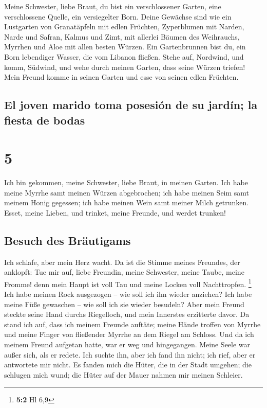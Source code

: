 Meine Schwester, liebe Braut, du bist ein verschlossener
Garten, eine verschlossene Quelle, ein versiegelter Born.
 Deine Gewächse sind wie ein Lustgarten von Granatäpfeln
mit edlen Früchten, Zyperblumen mit Narden,  Narde und
Safran, Kalmus und Zimt, mit allerlei Bäumen des Weihrauchs, Myrrhen und
Aloe mit allen besten Würzen.  Ein Gartenbrunnen bist du,
ein Born lebendiger Wasser, die vom Libanon fließen. 
Stehe auf, Nordwind, und komm, Südwind, und wehe durch meinen Garten,
dass seine Würzen triefen! Mein Freund komme in seinen Garten und esse
von seinen edlen Früchten.

\hypertarget{el-joven-marido-toma-posesiuxf3n-de-su-jarduxedn-la-fiesta-de-bodas}{%
\subsection{El joven marido toma posesión de su jardín; la fiesta de
bodas}\label{el-joven-marido-toma-posesiuxf3n-de-su-jarduxedn-la-fiesta-de-bodas}}

\hypertarget{section-4}{%
\section{5}\label{section-4}}

 Ich bin gekommen, meine Schwester, liebe Braut, in meinen
Garten. Ich habe meine Myrrhe samt meinen Würzen abgebrochen; ich habe
meinen Seim samt meinem Honig gegessen; ich habe meinen Wein samt meiner
Milch getrunken. Esset, meine Lieben, und trinket, meine Freunde, und
werdet trunken!

\hypertarget{besuch-des-bruxe4utigams}{%
\subsection{Besuch des Bräutigams}\label{besuch-des-bruxe4utigams}}

 Ich schlafe, aber mein Herz wacht. Da ist die Stimme
meines Freundes, der anklopft: Tue mir auf, liebe Freundin, meine
Schwester, meine Taube, meine Fromme! denn mein Haupt ist voll Tau und
meine Locken voll Nachttropfen. \footnote{\textbf{5:2} Hl 6,9}
 Ich habe meinen Rock ausgezogen -- wie soll ich ihn
wieder anziehen? Ich habe meine Füße gewaschen -- wie soll ich sie
wieder besudeln?  Aber mein Freund steckte seine Hand
durchs Riegelloch, und mein Innerstes erzitterte davor. 
Da stand ich auf, dass ich meinem Freunde auftäte; meine Hände troffen
von Myrrhe und meine Finger von fließender Myrrhe an dem Riegel am
Schloss.  Und da ich meinem Freund aufgetan hatte, war er
weg und hingegangen. Meine Seele war außer sich, als er redete. Ich
suchte ihn, aber ich fand ihn nicht; ich rief, aber er antwortete mir
nicht.  Es fanden mich die Hüter, die in der Stadt
umgehen; die schlugen mich wund; die Hüter auf der Mauer nahmen mir
meinen Schleier.

